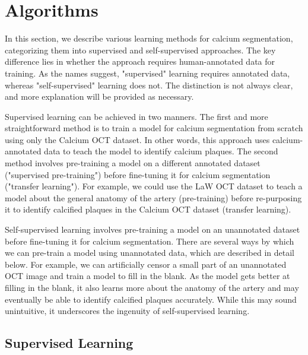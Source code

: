 \documentclass[a4paper,11pt,oneside]{report}
\begin{document}
\newpage
\section{Algorithms}
In this section, we describe various learning methods for calcium segmentation, categorizing them into supervised and self-supervised approaches. The key difference lies in whether the approach requires human-annotated data for training. As the names suggest, "supervised" learning requires annotated data, whereas "self-supervised" learning does not. The distinction is not always clear, and more explanation will be provided as necessary.

Supervised learning can be achieved in two manners. The first and more straightforward method is to train a model for calcium segmentation from scratch using only the Calcium OCT dataset. In other words, this approach uses calcium-annotated data to teach the model to identify calcium plaques. The second method involves pre-training a model on a different annotated dataset ("supervised pre-training") before fine-tuning it for calcium segmentation ("transfer learning"). For example, we could use the LaW OCT dataset to teach a model about the general anatomy of the artery (pre-training) before re-purposing it to identify calcified plaques in the Calcium OCT dataset (transfer learning). 

Self-supervised learning involves pre-training a model on an unannotated dataset before fine-tuning it for calcium segmentation. There are several ways by which we can pre-train a model using unannotated data, which are described in detail below. For example, we can artificially censor a small part of an unannotated OCT image and train a model to fill in the blank. As the model gets better at filling in the blank, it also learns more about the anatomy of the artery and may eventually be able to identify calcified plaques accurately. While this may sound unintuitive, it underscores the ingenuity of self-supervised learning.  


\subsection{Supervised Learning}
\end{document}
